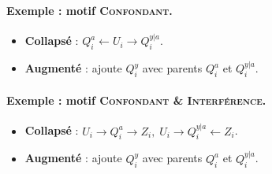 \documentclass[11pt,a4paper]{article}
\begin{document}
\paragraph{Exemple : motif \textsc{Confondant}.}
\begin{itemize}
  \item \textbf{Collapsé} : $Q^a_i \leftarrow U_i \rightarrow Q^{y|a}_i$.
  \item \textbf{Augmenté} : ajoute $Q^y_i$ avec parents $Q^a_i$ et $Q^{y|a}_i$.
\end{itemize}

\paragraph{Exemple : motif \textsc{Confondant \& Interférence}.}
\begin{itemize}
  \item \textbf{Collapsé} : $U_i \to Q^a_i \to Z_i,\; U_i \to Q^{y|a}_i \leftarrow Z_i$.
  \item \textbf{Augmenté} : ajoute $Q^y_i$ avec parents $Q^a_i$ et $Q^{y|a}_i$.
\end{itemize}
\end{document}
